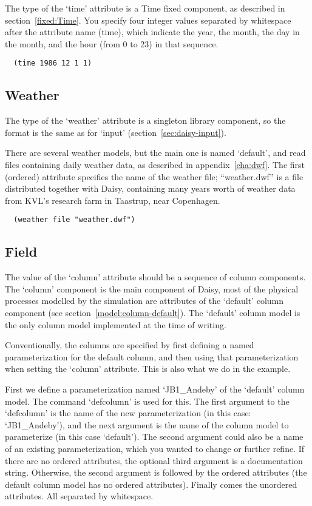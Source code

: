 The type of the `time' attribute is a Time fixed component, as
described in section~\ref{fixed:Time}.  You specify four integer
values separated by whitespace after the attribute name (time), which
indicate the year, the month, the day in the month, and the hour (from
0 to 23) in that sequence.

\begin{verbatim}
  (time 1986 12 1 1)
\end{verbatim}


\subsection{Weather}
\label{sec:weather}

The type of the `weather' attribute is a singleton library component,
so the format is the same as for `input'
(section~\ref{sec:daisy-input}).

There are several weather models, but the main one is named `default',
and read files containing daily weather data, as described in
appendix~\ref{cha:dwf}.  The first (ordered) attribute specifies the
name of the weather file; ``weather.dwf'' is a file distributed
together with Daisy, containing many years worth of weather data from
KVL's research farm in Taastrup, near Copenhagen.

\begin{verbatim}
  (weather file "weather.dwf")
\end{verbatim}

\subsection{Field}
\label{sec:column}

The value of the `column' attribute should be a sequence of column
components.  The `column' component is the main component of Daisy,
most of the physical processes modelled by the simulation are
attributes of the `default' column component (see
section~\ref{model:column-default}).  The `default' column model is
the only column model implemented at the time of writing.

Conventionally, the columns are specified by first defining a named
parameterization for the default column, and then using that
parameterization when setting the `column' attribute.  This is also
what we do in the example.

First we define a parameterization named `JB1\_Andeby' of the
`default' column model.  The command `defcolumn' is used for this.
The first argument to the `defcolumn' is the name of the new
parameterization (in this case: `JB1\_Andeby'), and the next argument
is the name of the column model to parameterize (in this case
`default').  The second argument could also be a name of an existing
parameterization, which you wanted to change or further refine.  If
there are no ordered attributes, the optional third argument is a
documentation string.  Otherwise, the second argument is followed by
the ordered attributes (the default column model has no ordered
attributes).  Finally comes the unordered attributes.  All separated
by whitespace.

